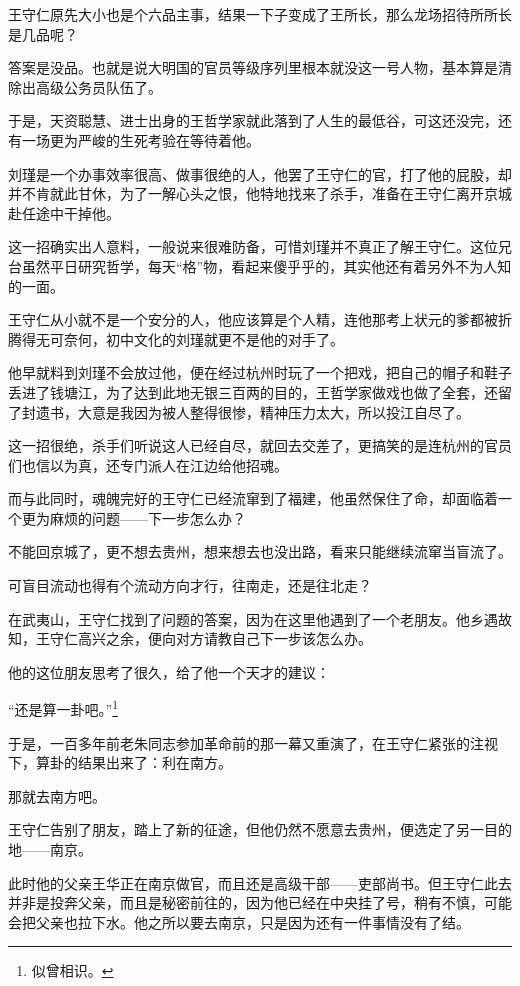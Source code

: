 \begin{multicols}{\theparacolNo}
		王守仁原先大小也是个六品主事，结果一下子变成了王所长，那么龙场招待所所长是几品呢？

		答案是没品。也就是说大明国的官员等级序列里根本就没这一号人物，基本算是清除出高级公务员队伍了。

		于是，天资聪慧、进士出身的王哲学家就此落到了人生的最低谷，可这还没完，还有一场更为严峻的生死考验在等待着他。

		刘瑾是一个办事效率很高、做事很绝的人，他罢了王守仁的官，打了他的屁股，却并不肯就此甘休，为了一解心头之恨，他特地找来了杀手，准备在王守仁离开京城赴任途中干掉他。

		这一招确实出人意料，一般说来很难防备，可惜刘瑾并不真正了解王守仁。这位兄台虽然平日研究哲学，每天“格”物，看起来傻乎乎的，其实他还有着另外不为人知的一面。

		王守仁从小就不是一个安分的人，他应该算是个人精，连他那考上状元的爹都被折腾得无可奈何，初中文化的刘瑾就更不是他的对手了。

		他早就料到刘瑾不会放过他，便在经过杭州时玩了一个把戏，把自己的帽子和鞋子丢进了钱塘江，为了达到此地无银三百两的目的，王哲学家做戏也做了全套，还留了封遗书，大意是我因为被人整得很惨，精神压力太大，所以投江自尽了。

		这一招很绝，杀手们听说这人已经自尽，就回去交差了，更搞笑的是连杭州的官员们也信以为真，还专门派人在江边给他招魂。

		而与此同时，魂魄完好的王守仁已经流窜到了福建，他虽然保住了命，却面临着一个更为麻烦的问题——下一步怎么办？

		不能回京城了，更不想去贵州，想来想去也没出路，看来只能继续流窜当盲流了。

		可盲目流动也得有个流动方向才行，往南走，还是往北走？

		在武夷山，王守仁找到了问题的答案，因为在这里他遇到了一个老朋友。他乡遇故知，王守仁高兴之余，便向对方请教自己下一步该怎么办。

		他的这位朋友思考了很久，给了他一个天才的建议：

		“还是算一卦吧。”\footnote{似曾相识。}

		于是，一百多年前老朱同志参加革命前的那一幕又重演了，在王守仁紧张的注视下，算卦的结果出来了：利在南方。

		那就去南方吧。

		王守仁告别了朋友，踏上了新的征途，但他仍然不愿意去贵州，便选定了另一目的地——南京。

		此时他的父亲王华正在南京做官，而且还是高级干部——吏部尚书。但王守仁此去并非是投奔父亲，而且是秘密前往的，因为他已经在中央挂了号，稍有不慎，可能会把父亲也拉下水。他之所以要去南京，只是因为还有一件事情没有了结。


\end{multicols}
